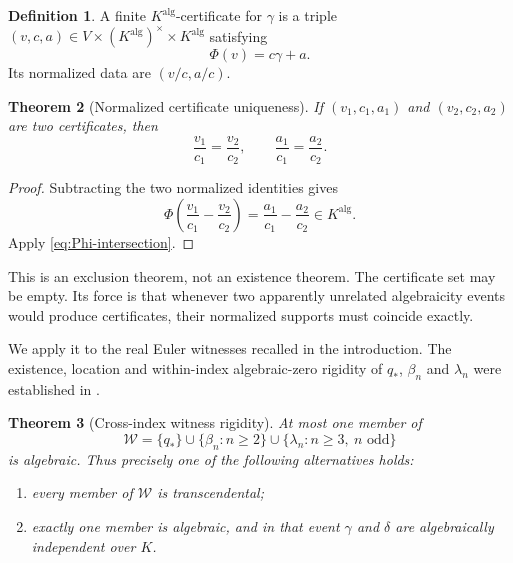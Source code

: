 \documentclass[11pt]{article}
\theoremstyle{keio}
\newtheorem{theorem}{Theorem}[section]
\theoremstyle{definition}
\newtheorem{definition}[theorem]{Definition}
\theoremstyle{remark}
\begin{document}
\begin{definition}
A finite \(K^{\mathrm{alg}}\)-certificate for \(\gamma\) is a triple
\((v,c,a)\in V\times(K^{\mathrm{alg}})^\times\times K^{\mathrm{alg}}\)
satisfying
\begin{equation}\label{eq:certificate}
 \Phi(v)=c\gamma+a.
\end{equation}
Its normalized data are \((v/c,a/c)\).
\end{definition}

\begin{theorem}[Normalized certificate uniqueness]
\label{thm:certificate-uniqueness}
If \((v_1,c_1,a_1)\) and \((v_2,c_2,a_2)\) are two certificates, then
\begin{equation}\label{eq:normalized-certificate-unique}
 \boxed{\displaystyle
 \frac{v_1}{c_1}=\frac{v_2}{c_2},\qquad
 \frac{a_1}{c_1}=\frac{a_2}{c_2}.}
\end{equation}
\end{theorem}

\begin{proof}
Subtracting the two normalized identities gives
\[
 \Phi\!\left(\frac{v_1}{c_1}-\frac{v_2}{c_2}\right)
 =\frac{a_1}{c_1}-\frac{a_2}{c_2}\in K^{\mathrm{alg}}.
\]
Apply \eqref{eq:Phi-intersection}.
\end{proof}

This is an exclusion theorem, not an existence theorem.  The certificate
set may be empty.  Its force is that whenever two apparently unrelated
algebraicity events would produce certificates, their normalized supports
must coincide exactly.

We apply it to the real Euler witnesses recalled in the introduction.  The
existence, location and within-index algebraic-zero rigidity of \(q_*\),
\(\beta_n\) and \(\lambda_n\) were established in
\cite[Thm.~14.2, Prop.~14.3, and Thm.~14.4]{KEIO2026I}.

\begin{theorem}[Cross-index witness rigidity]
\label{thm:cross-index}
At most one member of
\begin{equation}\label{eq:witness-set}
 \mathcal W=
 \{q_*\}\cup\{\beta_n:n\ge2\}
 \cup\{\lambda_n:n\ge3,\ n\text{ odd}\}
\end{equation}
is algebraic.  Thus precisely one of the following alternatives holds:
\begin{enumerate}[label=\textup{(\roman*)}]
 \item every member of \(\mathcal W\) is transcendental;
 \item exactly one member is algebraic, and in that event \(\gamma\) and
 \(\delta\) are algebraically independent over \(K\).
\end{enumerate}
\end{theorem}
\end{document}
